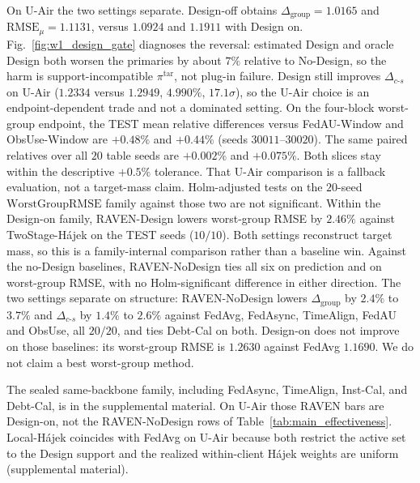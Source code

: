 \documentclass[letterpaper,journal]{IEEEtran}
\begin{document}
On U-Air the two settings separate.  Design-off obtains
$\Delta_{\mathrm{group}}=1.0165$ and $\mathrm{RMSE}_{\mu}=1.1131$,
versus $1.0924$ and $1.1911$ with Design on.  Fig.~\ref{fig:w1_design_gate}
diagnoses the reversal: estimated Design and oracle Design both worsen the
primaries by about $7\%$ relative to No-Design, so the harm is
support-incompatible $\pi^{\mathrm{tar}}$, not plug-in failure.
Design still improves $\Delta_{c\text{-}s}$ on U-Air ($1.2334$ versus
$1.2949$, $4.990\%$, $17.1\sigma$), so the U-Air choice is an
endpoint-dependent trade and not a dominated setting.  On the
four-block worst-group endpoint, the TEST mean relative differences versus
FedAU-Window and ObsUse-Window are $+0.48\%$ and $+0.44\%$
(seeds $30011$--$30020$).
The same paired relatives over all $20$ table seeds are $+0.002\%$ and
$+0.075\%$.
Both slices stay within the descriptive $+0.5\%$ tolerance.  That U-Air comparison is a
fallback evaluation, not a target-mass claim.
Holm-adjusted tests on the $20$-seed $\mathrm{WorstGroupRMSE}$ family against
those two are not significant.
Within the Design-on family, RAVEN-Design lowers worst-group RMSE by $2.46\%$
against TwoStage-H\'ajek on the TEST seeds ($10/10$).  Both settings reconstruct
target mass, so this is a family-internal comparison rather than a baseline win.
Against the no-Design baselines, RAVEN-NoDesign ties all six on prediction and
on worst-group RMSE, with no Holm-significant difference in either direction.
The two settings separate on structure: RAVEN-NoDesign lowers
$\Delta_{\mathrm{group}}$ by $2.4\%$ to $3.7\%$ and $\Delta_{c\text{-}s}$ by
$1.4\%$ to $2.6\%$ against FedAvg, FedAsync, TimeAlign, FedAU and ObsUse, all
$20/20$, and ties Debt-Cal on both.  Design-on does not improve on those
baselines: its worst-group RMSE is $1.2630$ against FedAvg $1.1690$.  We do not
claim a best worst-group method.

The sealed same-backbone family, including FedAsync, TimeAlign,
Inst-Cal, and Debt-Cal, is in the supplemental material.  On U-Air
those RAVEN bars are Design-on, not the RAVEN-NoDesign rows of
Table~\ref{tab:main_effectiveness}.  Local-H\'ajek coincides with
FedAvg on U-Air because both restrict the active set to the Design support and
the realized within-client H\'ajek weights are uniform (supplemental material).
\end{document}

